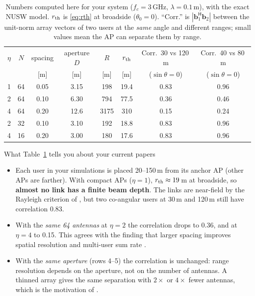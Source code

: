 \documentclass[11pt]{article}
\newcommand{\bb}{\mathbf{b}}
\begin{document}
\begin{table}[h]
\centering
\caption{Numbers computed here for your system ($f_c=3$\,GHz, $\lambda=0.1$\,m), with the exact NUSW model. $r_{\rm th}$ is \eqref{eq:rth} at broadside ($\theta_0=0$). ``Corr.'' is $|\bb_1^{\mathsf H}\bb_2|$ between the unit-norm array vectors of two users at the \emph{same} angle and different ranges; small values mean the AP can separate them by range.}
\label{tab:numbers}
\begin{tabular}{@{}cccccccc@{}}
\toprule
$\eta$ & $N$ & spacing & aperture $D$ & $R$ & $r_{\rm th}$ & Corr.\ 30 vs 120\,m & Corr.\ 40 vs 80\,m\\
 & & [m] & [m] & [m] & [m] & ($\sin\theta=0$) & ($\sin\theta=0$)\\
\midrule
1 & 64 & 0.05 & 3.15 & 198 & 19.4 & 0.83 & 0.96\\
2 & 64 & 0.10 & 6.30 & 794 & 77.5 & 0.36 & 0.46\\
4 & 64 & 0.20 & 12.6 & 3175 & 310 & 0.15 & 0.24\\
\midrule
2 & 32 & 0.10 & 3.10 & 192 & 18.8 & 0.83 & 0.96\\
4 & 16 & 0.20 & 3.00 & 180 & 17.6 & 0.83 & 0.96\\
\bottomrule
\end{tabular}
\end{table}

\begin{keybox}{What Table~\ref{tab:numbers} tells you about your current papers}
\begin{itemize}
  \item Each user in your simulations is placed 20--150\,m from its anchor AP (other APs are farther). With compact APs ($\eta=1$), $r_{\rm th}\approx19$\,m at broadside, so \textbf{almost no link has a finite beam depth}. The links are near-field by the Rayleigh criterion of \cite{haider2026vtc}, but two co-angular users at 30\,m and 120\,m still have correlation 0.83.
  \item With the \emph{same 64 antennas} at $\eta=2$ the correlation drops to 0.36, and at $\eta=4$ to 0.15. This agrees with the finding that larger spacing improves spatial resolution and multi-user sum rate \cite{chen2024nearfield,wang2024sparsemimo}.
  \item With the \emph{same aperture} (rows 4--5) the correlation is unchanged: range resolution depends on the aperture, not on the number of antennas. A thinned array gives the same separation with $2\times$ or $4\times$ fewer antennas, which is the motivation of \cite{hussain2026thinning}.
\end{itemize}
\end{keybox}
\end{document}
